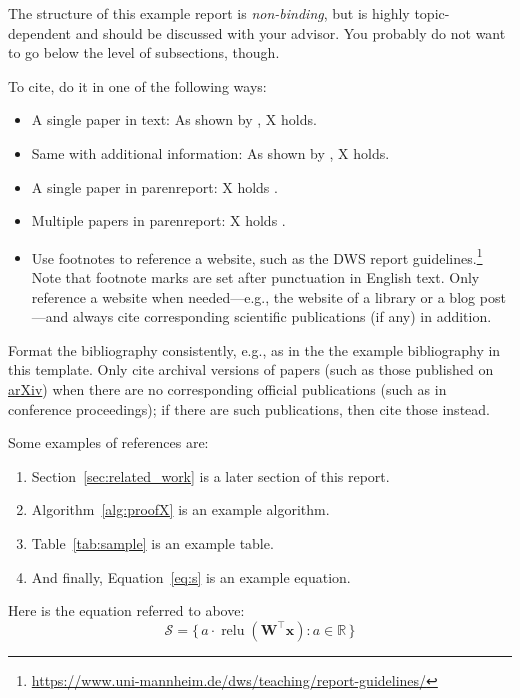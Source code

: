 \documentclass[a4paper,oneside,bibliography=totoc]{scrartcl}
\begin{document}
The structure of this example report is \emph{non-binding}, but is highly
topic-dependent and should be discussed with your advisor. You probably do not
want to go below the level of subsections, though.

To cite, do it in one of the following ways:
\begin{itemize}
\item A single paper in text: As shown by \citet{doe2024proof}, X holds.
\item Same with additional information: As shown by \citet[p. 20]{doe2024proof},
  X holds.
\item A single paper in parenreport: X holds \cite{doe2024proof}.
\item Multiple papers in parenreport: X holds
  \cite{brown2022techreport,smith2023conference,lee2023journal,doe2024proof}.
\item Use footnotes to reference a website, such as the DWS report
  guidelines.\footnote{\url{https://www.uni-mannheim.de/dws/teaching/report-guidelines/}}
  Note that footnote marks are set after punctuation in English text. Only
  reference a website when needed---e.g., the website of a library or a blog
  post---and always cite corresponding scientific publications (if any) in
  addition.
\end{itemize}
Format the bibliography consistently, e.g., as in the the example bibliography
in this template. Only cite archival versions of papers (such as those published
on \href{https://arxiv.org}{arXiv}) when there are no corresponding official
publications (such as in conference proceedings); if there are such
publications, then cite those instead.


Some examples of references are:
\begin{enumerate}
\item Section~\ref{sec:related_work} is a later section of this report.
\item Algorithm~\ref{alg:proofX} is an example algorithm.
\item Table~\ref{tab:sample} is an example table.
\item And finally, Equation~\eqref{eq:s} is an example equation.
\end{enumerate}

Here is the equation referred to above:
\begin{equation}
  \label{eq:s}
  \mathcal{S}=\{\,a\cdot \operatorname{relu}(\mathbf{W^\top}\mathbf{x}) :
  a\in\mathbb{R} \,\}
\end{equation}
\end{document}
